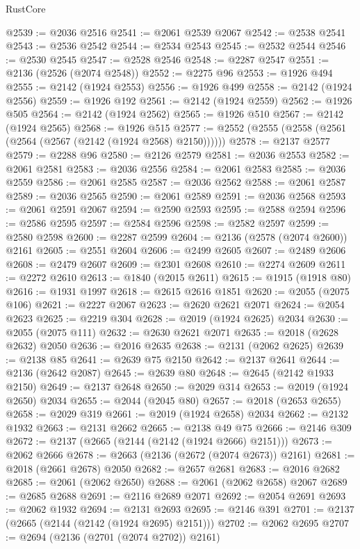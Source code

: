 \begin{lexlean}{RustCore}
\begin{coremodule}
@2539 := @2036 @2516
@2541 := @2061 @2539 @2067
@2542 := @2538 @2541
@2543 := @2536 @2542
@2544 := @2534 @2543
@2545 := @2532 @2544
@2546 := @2530 @2545
@2547 := @2528 @2546
@2548 := @2287 @2547
@2551 := @2136 (@2526 (@2074 @2548))
@2552 := @2275 @96
@2553 := @1926 @494
@2555 := @2142 (@1924 @2553)
@2556 := @1926 @499
@2558 := @2142 (@1924 @2556)
@2559 := @1926 @192
@2561 := @2142 (@1924 @2559)
@2562 := @1926 @505
@2564 := @2142 (@1924 @2562)
@2565 := @1926 @510
@2567 := @2142 (@1924 @2565)
@2568 := @1926 @515
@2577 := @2552 (@2555 (@2558 (@2561 (@2564 (@2567 (@2142 (@1924 @2568) @2150))))))
@2578 := @2137 @2577
@2579 := @2288 @96
@2580 := @2126 @2579
@2581 := @2036 @2553
@2582 := @2061 @2581
@2583 := @2036 @2556
@2584 := @2061 @2583
@2585 := @2036 @2559
@2586 := @2061 @2585
@2587 := @2036 @2562
@2588 := @2061 @2587
@2589 := @2036 @2565
@2590 := @2061 @2589
@2591 := @2036 @2568
@2593 := @2061 @2591 @2067
@2594 := @2590 @2593
@2595 := @2588 @2594
@2596 := @2586 @2595
@2597 := @2584 @2596
@2598 := @2582 @2597
@2599 := @2580 @2598
@2600 := @2287 @2599
@2604 := @2136 (@2578 (@2074 @2600)) @2161
@2605 := @2551 @2604
@2606 := @2499 @2605
@2607 := @2489 @2606
@2608 := @2479 @2607
@2609 := @2301 @2608
@2610 := @2274 @2609
@2611 := @2272 @2610
@2613 := @1840 (@2015 @2611)
@2615 := @1915 (@1918 @80)
@2616 := @1931 @1997
@2618 := @2615 @2616 @1851
@2620 := @2055 (@2075 @106)
@2621 := @2227 @2067
@2623 := @2620 @2621 @2071
@2624 := @2054 @2623
@2625 := @2219 @304
@2628 := @2019 (@1924 @2625) @2034
@2630 := @2055 (@2075 @111)
@2632 := @2630 @2621 @2071
@2635 := @2018 (@2628 @2632) @2050
@2636 := @2016 @2635
@2638 := @2131 (@2062 @2625)
@2639 := @2138 @85
@2641 := @2639 @75 @2150
@2642 := @2137 @2641
@2644 := @2136 (@2642 @2087)
@2645 := @2639 @80
@2648 := @2645 (@2142 @1933 @2150)
@2649 := @2137 @2648
@2650 := @2029 @314
@2653 := @2019 (@1924 @2650) @2034
@2655 := @2044 (@2045 @80)
@2657 := @2018 (@2653 @2655)
@2658 := @2029 @319
@2661 := @2019 (@1924 @2658) @2034
@2662 := @2132 @1932
@2663 := @2131 @2662
@2665 := @2138 @49 @75
@2666 := @2146 @309
@2672 := @2137 (@2665 (@2144 (@2142 (@1924 @2666) @2151)))
@2673 := @2062 @2666
@2678 := @2663 (@2136 (@2672 (@2074 @2673)) @2161)
@2681 := @2018 (@2661 @2678) @2050
@2682 := @2657 @2681
@2683 := @2016 @2682
@2685 := @2061 (@2062 @2650)
@2688 := @2061 (@2062 @2658) @2067
@2689 := @2685 @2688
@2691 := @2116 @2689 @2071
@2692 := @2054 @2691
@2693 := @2062 @1932
@2694 := @2131 @2693
@2695 := @2146 @391
@2701 := @2137 (@2665 (@2144 (@2142 (@1924 @2695) @2151)))
@2702 := @2062 @2695
@2707 := @2694 (@2136 (@2701 (@2074 @2702)) @2161)

\end{coremodule}
\end{lexlean}

